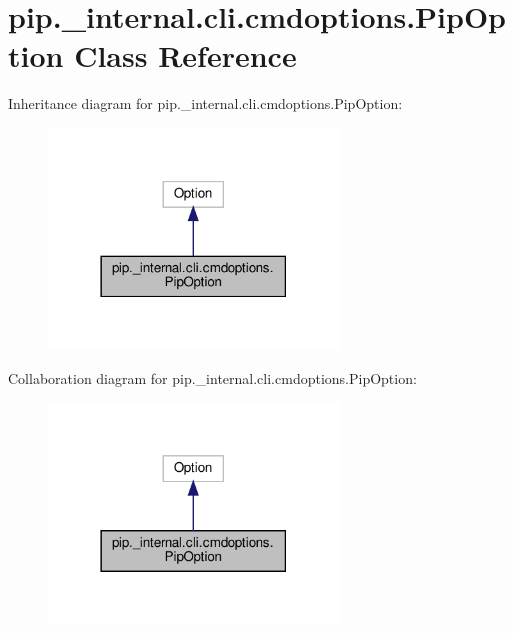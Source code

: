 \hypertarget{classpip_1_1__internal_1_1cli_1_1cmdoptions_1_1PipOption}{}\section{pip.\+\_\+internal.\+cli.\+cmdoptions.\+Pip\+Option Class Reference}
\label{classpip_1_1__internal_1_1cli_1_1cmdoptions_1_1PipOption}


Inheritance diagram for pip.\+\_\+internal.\+cli.\+cmdoptions.\+Pip\+Option\+:
\nopagebreak
\begin{figure}[H]
\begin{center}
\leavevmode
\includegraphics[width=218pt]{classpip_1_1__internal_1_1cli_1_1cmdoptions_1_1PipOption__inherit__graph}
\end{center}
\end{figure}


Collaboration diagram for pip.\+\_\+internal.\+cli.\+cmdoptions.\+Pip\+Option\+:
\nopagebreak
\begin{figure}[H]
\begin{center}
\leavevmode
\includegraphics[width=218pt]{classpip_1_1__internal_1_1cli_1_1cmdoptions_1_1PipOption__coll__graph}
\end{center}
\end{figure}
